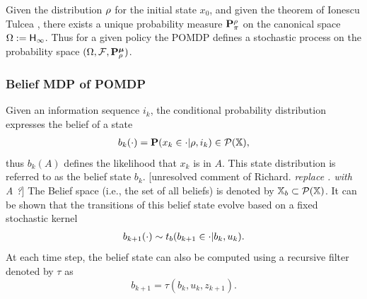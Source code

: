 \documentclass{ifacconf}
\newcommand{\red}[1]{{\color{red} #1}}
\begin{document}
 Given the distribution $\rho$ for the initial state $x_0$,  and given the theorem of Ionescu Tulcea \citep{hll1996}, there exists a unique probability measure $\mathbf{P}_\pi^\rho$ on the canonical space $\Omega:={\mathsf{H}}_\infty$. Thus for a given policy the POMDP defines a stochastic process on the probability space  
 $(\Omega,\mathcal F,\mathbf{P}_\rho^{\boldsymbol{\mu}})$.
%
%

 \subsubsection{Belief MDP of POMDP}
 Given an information sequence $i_k$,  the conditional probability distribution expresses the belief of a state 
\begin{align}
	b_k(\cdot)=\mathbf{P}(x_k\in \cdot|\rho,i_k)\in \mathcal P ({\mathbb{X}}),
\end{align}
thus $	b_k(A) $ defines the likelihood that $x_k$ is in $A$.  %
This state distribution is referred to as the belief state $b_k$.  \red{[unresolved comment of Richard. {\it replace . with A ?}]}
The Belief space (i.e., the set of all beliefs) is denoted by ${{\mathbb{X}}_b}\subset \mathcal P({\mathbb{X}})$.
It can be shown that the transitions of this belief state evolve based on a fixed stochastic kernel
\begin{align}\label{eq:trb}
	 b_{k+1}(\cdot)\sim t_b(b_{k+1}\in \cdot|b_k,u_k).
\end{align}
At each time step, the belief state can also be computed using a 
recursive filter denoted by $\tau$ as 
\[b_{k+1}=\tau(b_k,u_k,z_{k+1}).\]
\end{document}
